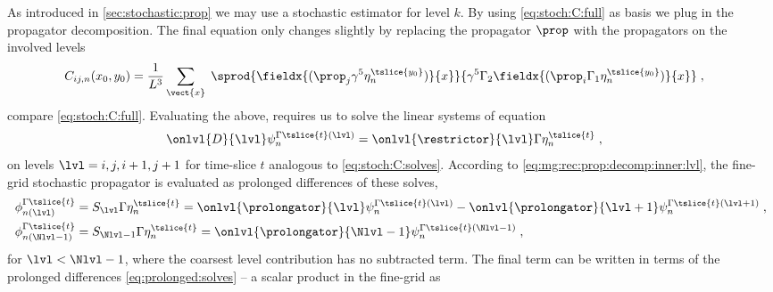 As introduced in \cref{sec:stochastic:prop} we may use a stochastic estimator for level $k$.
By using \cref{eq:stoch:C:full} as basis we plug in the propagator decomposition.
The final equation only changes slightly by replacing the propagator $\prop$ with the propagators on the involved levels
\begin{align}
C_{ij,n}(x_0, y_0)
&= \frac{1}{L^{3}} \sum_{\vect{x}} \;
\sprod{
  \fieldx{(\prop_j \gamma^{5} \eta_n^{\tslice{y_0}})}{x}
}{
  \gamma^{5}
  \Gamma_2
  \fieldx{(\prop_i \Gamma_1 \eta_n^{\tslice{y_0}})}{x}
} \;,
\end{align}
compare \cref{eq:stoch:C:full}.
Evaluating the above, requires us to solve the linear systems of equation
\begin{align}
\onlvl{D}{\lvl  }
\psi_{n}^{\Gamma \tslice{t} (\lvl)} &=
\onlvl{\mathcal{\restrictor}}{\lvl  }
\Gamma \eta_n^{\tslice{t}} \;,
\end{align}
on levels $\lvl = i, j, i+1, j+1$ for time-slice $t$ analogous to \cref{eq:stoch:C:solves}.
According to \cref{eq:mg:rec:prop:decomp:inner:lvl}, the fine-grid stochastic propagator is evaluated as prolonged differences of these solves,
\begin{align} \label{eq:prolonged:solves}
\phi_{n(\lvl)}^{\Gamma \tslice{t}}
&= S_{\lvl} \Gamma \eta_n^{\tslice{t}}
= \onlvl{\mathcal{\prolongator}}{\lvl  }
  \psi_{n}^{\Gamma \tslice{t} (\lvl)}
- \onlvl{\mathcal{\prolongator}}{\lvl+1}
  \psi_{n}^{\Gamma \tslice{t} (\lvl+1)} \;, \\
\phi_{n(\Nlvl-1)}^{\Gamma \tslice{t}}
&= S_{\Nlvl-1} \Gamma \eta_n^{\tslice{t}}
= \onlvl{\mathcal{\prolongator}}{\Nlvl-1  }
  \psi_{n}^{\Gamma \tslice{t} (\Nlvl-1)} \;,
\end{align}
for $\lvl < \Nlvl-1$, where the coarsest level contribution has no subtracted term.
The final term can be written in terms of the prolonged differences \cref{eq:prolonged:solves} -- a scalar product in the fine-grid as
